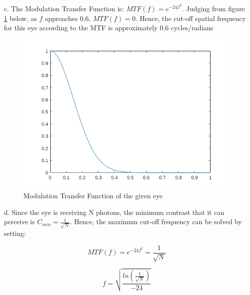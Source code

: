 \documentclass[letterpaper, 11pt]{article}
\begin{document}
c. The Modulation Transfer Function is: $MTF(f) = e^{-24f^2}$. Judging from figure \ref{fig2} below, as $f$ approaches $0.6$, $MTF(f) = 0$. Hence, the cut-off spatial frequency for this eye according to the MTF is approximately 0.6 cycles/radians

\begin{figure}[htb!]
	\centering
	\includegraphics[width=0.6\linewidth]{2c.png}
	\caption{Modulation Transfer Function of the given eye}
	\label{fig2}
\end{figure}

d. Since the eye is receiving N photons, the minimum contrast that it can perceive is $C_{min} = \frac{1}{\sqrt{N}}$. Hence, the maximum cut-off frequency can be solved by setting:

\begin{equation}
	MTF(f) = e^{-24f^2} = \frac{1}{\sqrt{N}}
\end{equation}

\begin{equation}
	f = \sqrt{\frac{ln(\frac{1}{\sqrt{N}})}{-24}}
\end{equation}
\end{document}
